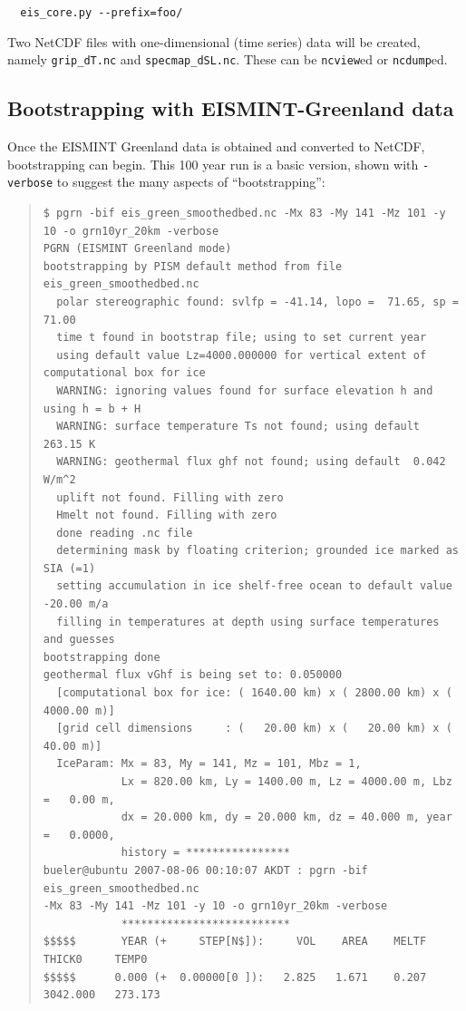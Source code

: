 \documentclass[11pt,final]{amsart}
\begin{document}
\verb|  eis_core.py --prefix=foo/|

Two NetCDF files with one-dimensional (time series) data will be created, namely \verb|grip_dT.nc| and \verb|specmap_dSL.nc|.  These can be \verb|ncview|ed or \verb|ncdump|ed.

\subsection{Bootstrapping with EISMINT-Greenland data}  Once the EISMINT Greenland data is obtained and converted to NetCDF, bootstrapping can begin.  This 100 year run is a basic version, shown with \verb|-verbose| to suggest the many aspects of ``bootstrapping'':

\small\begin{quote}\begin{verbatim}
$ pgrn -bif eis_green_smoothedbed.nc -Mx 83 -My 141 -Mz 101 -y 10 -o grn10yr_20km -verbose
PGRN (EISMINT Greenland mode)
bootstrapping by PISM default method from file eis_green_smoothedbed.nc
  polar stereographic found: svlfp = -41.14, lopo =  71.65, sp =  71.00
  time t found in bootstrap file; using to set current year
  using default value Lz=4000.000000 for vertical extent of computational box for ice
  WARNING: ignoring values found for surface elevation h and using h = b + H
  WARNING: surface temperature Ts not found; using default  263.15 K
  WARNING: geothermal flux ghf not found; using default  0.042 W/m^2
  uplift not found. Filling with zero
  Hmelt not found. Filling with zero
  done reading .nc file
  determining mask by floating criterion; grounded ice marked as SIA (=1)
  setting accumulation in ice shelf-free ocean to default value -20.00 m/a
  filling in temperatures at depth using surface temperatures and guesses
bootstrapping done
geothermal flux vGhf is being set to: 0.050000
  [computational box for ice: ( 1640.00 km) x ( 2800.00 km) x ( 4000.00 m)]
  [grid cell dimensions     : (   20.00 km) x (   20.00 km) x (   40.00 m)]
  IceParam: Mx = 83, My = 141, Mz = 101, Mbz = 1,
            Lx = 820.00 km, Ly = 1400.00 m, Lz = 4000.00 m, Lbz =   0.00 m,
            dx = 20.000 km, dy = 20.000 km, dz = 40.000 m, year =   0.0000,
            history = ****************
bueler@ubuntu 2007-08-06 00:10:07 AKDT : pgrn -bif eis_green_smoothedbed.nc 
-Mx 83 -My 141 -Mz 101 -y 10 -o grn10yr_20km -verbose
            **************************
$$$$$       YEAR (+     STEP[N$]):     VOL    AREA    MELTF     THICK0     TEMP0
$$$$$      0.000 (+  0.00000[0 ]):   2.825   1.671    0.207   3042.000   273.173

\end{verbatim}
\end{quote}
\end{document}
